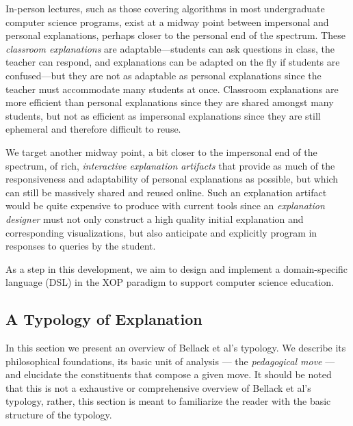 \documentclass[conference]{IEEEtran}
\begin{document}
In-person lectures, such as those covering algorithms in most undergraduate
computer science programs, exist at a midway point between impersonal and
personal explanations, perhaps closer to the personal end of the spectrum.
These \emph{classroom explanations} are adaptable---students can ask questions
in class, the teacher can respond, and explanations can be adapted on the fly
if students are confused---but they are not as adaptable as personal
explanations since the teacher must accommodate many students at once.
Classroom explanations are more efficient than personal explanations since they
are shared amongst many students, but not as efficient as impersonal
explanations since they are still ephemeral and therefore difficult to reuse.


We target another midway point, a bit closer to the impersonal end of the
spectrum, of rich, \emph{interactive explanation artifacts} that provide as
much of the responsiveness and adaptability of personal explanations as
possible, but which can still be massively shared and reused online. Such an
explanation artifact would be quite expensive to produce with current tools
since an \emph{explanation designer} must not only construct a high quality
initial explanation and corresponding visualizations, but also anticipate and
explicitly program in responses to queries by the student.




As a step in this development, we aim to design and implement a domain-specific
language (DSL) in the XOP paradigm to support computer science education. 


\subsection{A Typology of Explanation}
\label{sec:back:typ}

In this section we present an overview of Bellack et al's typology. We describe
its philosophical foundations, its basic unit of analysis --- the
\emph{pedagogical move} --- and elucidate the constituents that compose a given
move. It should be noted that this is not a exhaustive or comprehensive overview
of Bellack et al's typology, rather, this section is meant to familiarize the
reader with the basic structure of the typology.
\end{document}
